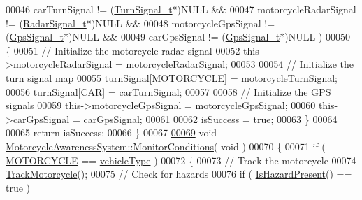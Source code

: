 \begin{DoxyCode}
00046          carTurnSignal != (\hyperlink{structTurnSignal__t}{TurnSignal\_t}*)NULL &&
00047          motorcycleRadarSignal != (\hyperlink{structRadarSignal__t}{RadarSignal\_t}*)NULL &&
00048          motorcycleGpsSignal != (\hyperlink{structGpsSignal__t}{GpsSignal\_t}*)NULL &&
00049          carGpsSignal != (\hyperlink{structGpsSignal__t}{GpsSignal\_t}*)NULL )
00050     \{
00051         \textcolor{comment}{// Initialize the motorcycle radar signal}
00052         this->motorcycleRadarSignal = \hyperlink{classMotorcycleAwarenessSystem_a0744e71b9f440a86f5078c876ba7629b}{motorcycleRadarSignal};
00053 
00054         \textcolor{comment}{// Initialize the turn signal map}
00055         \hyperlink{classMotorcycleAwarenessSystem_a43fde090639a3a58fc5bbf8bafc966f7}{turnSignal}[\hyperlink{MotorcycleAwarenessSystemTypes_8hpp_a0c05c42b98a847f971385c81c2a81afaa39b983b1f7acfc4e7c900d77b0fded6a}{MOTORCYCLE}] = motorcycleTurnSignal;
00056         \hyperlink{classMotorcycleAwarenessSystem_a43fde090639a3a58fc5bbf8bafc966f7}{turnSignal}[\hyperlink{MotorcycleAwarenessSystemTypes_8hpp_a0c05c42b98a847f971385c81c2a81afaa5fc54ebcb1dd4bf1e1b93cbc77b57b40}{CAR}] = carTurnSignal;
00057 
00058         \textcolor{comment}{// Initialize the GPS signals}
00059         this->motorcycleGpsSignal = \hyperlink{classMotorcycleAwarenessSystem_ab281a3993b574923b2f379ed0477b2d4}{motorcycleGpsSignal};
00060         this->carGpsSignal = \hyperlink{classMotorcycleAwarenessSystem_a9a8185e00b60d0be58bfa76166063128}{carGpsSignal};
00061 
00062         isSuccess = \textcolor{keyword}{true};
00063     \}
00064 
00065     \textcolor{keywordflow}{return} isSuccess;
00066 \}
00067 
\hypertarget{MotorcycleAwarenessSystem_8cpp_source_l00069}{}\hyperlink{classMotorcycleAwarenessSystem_afb19e832c17d43941d9ed6c4f4435a2e}{00069} \textcolor{keywordtype}{void} \hyperlink{classMotorcycleAwarenessSystem_afb19e832c17d43941d9ed6c4f4435a2e}{MotorcycleAwarenessSystem::MonitorConditions}( \textcolor{keywordtype}{void} )
00070 \{
00071     \textcolor{keywordflow}{if} ( \hyperlink{MotorcycleAwarenessSystemTypes_8hpp_a0c05c42b98a847f971385c81c2a81afaa39b983b1f7acfc4e7c900d77b0fded6a}{MOTORCYCLE} == \hyperlink{classMotorcycleAwarenessSystem_a977b2085bfbf6a62902bf2d80160e6d2}{vehicleType} )
00072     \{
00073         \textcolor{comment}{// Track the motorcycle}
00074         \hyperlink{classMotorcycleAwarenessSystem_a4e6eec23ec46e24ee377a3c94e15eba4}{TrackMotorcycle}();
00075         \textcolor{comment}{// Check for hazards}
00076         \textcolor{keywordflow}{if} ( \hyperlink{classMotorcycleAwarenessSystem_a35d59c8299b0d5ef43c10306cc7f2ee1}{IsHazardPresent}() == \textcolor{keyword}{true} )

\end{DoxyCode}
